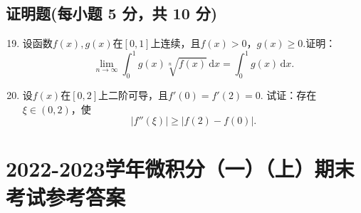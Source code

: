 \documentclass[../Main.tex]{subfiles}
\begin{document}
\section{证明题(每小题 5 分，共 10 分)}
\begin{enumerate}
    \setcounter{enumi}{18}
    \item 设函数$f(x),g(x)$在$[0,1]$上连续，且$f(x)>0$，$g(x)\geq0$.证明：
          \[
              \lim_{n\to\infty}\int_{0}^{1}g(x)\sqrt[n]{f(x)}\,\mathrm{d}x=\int_{0}^{1}g(
              x)\,\mathrm{d}x.
          \]
          \vspace{14em}

    \item 设$f(x)$在$[0,2]$上二阶可导，且$f'(0)=f'(2)=0$. 试证：存在$\xi\in(
              0,2)$，使
          \[
              |f''(\xi)|\geq|f(2)-f(0)|.
          \]
          \vspace{14em}
\end{enumerate}

\chapter{2022-2023学年微积分（一）（上）期末考试参考答案}
\end{document}
